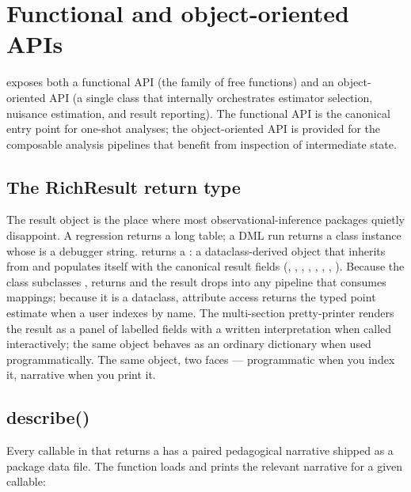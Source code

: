 \documentclass[article,shortnames,nojss]{jss}
\begin{document}
\section{Functional and object-oriented APIs}
\label{sec:api}

 exposes both a functional API (the
 family of free functions) and an
object-oriented API (a single  class that
internally orchestrates estimator selection, nuisance estimation,
and result reporting). The functional API is the canonical entry
point for one-shot analyses; the object-oriented API is provided
for the composable analysis pipelines that benefit from inspection
of intermediate state.

\subsection{The RichResult return type}

The result object is the place where most observational-inference
packages quietly disappoint. A regression returns a long table;
a DML run returns a class instance whose  is
a debugger string.  returns a : a
dataclass-derived object that inherits from  and
populates itself with the canonical result fields
(, , , ,
, , ,
). Because the class subclasses
,  returns
 and the result drops into any pipeline that consumes
mappings; because it is a dataclass, 
attribute access returns the typed point estimate when a user
indexes by name. The multi-section pretty-printer renders the
result as a panel of labelled fields with a written
interpretation when called interactively; the same object
behaves as an ordinary dictionary when used programmatically.
The same object, two faces --- programmatic when you index it,
narrative when you print it.

\subsection{describe()}

Every callable in  that returns a 
has a paired  pedagogical narrative
shipped as a package data file. The 
function loads and prints the relevant narrative for a given
callable:
\end{document}
